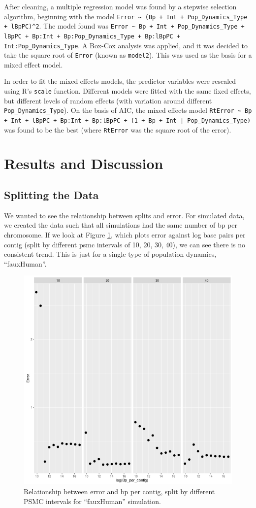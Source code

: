 \documentclass[11pt,a4paper]{article}
\begin{document}
After cleaning, a multiple regression model was found by a stepwise selection algorithm, beginning with the model \verb|Error ~ (Bp + Int + Pop_Dynamics_Type + lBpPC)^2|. The model found was \verb|Error ~ Bp + Int + Pop_Dynamics_Type + lBpPC + Bp:Int + Bp:Pop_Dynamics_Type + Bp:lBpPC + Int:Pop_Dynamics_Type|. A Box-Cox analysis was applied, and it was decided to take the square root of \verb|Error| (known as \verb|model2|). This was used as the basis for a mixed effect model.

In order to fit the mixed effects models, the predictor variables were rescaled using R's \verb|scale| function. Different models were fitted with the same fixed effects, but different levels of random effects (with variation around different \verb|Pop_Dynamics_Type|). On the basis of AIC, the mixed effects model \verb;RtError ~ Bp + Int + lBpPC + Bp:Int + Bp:lBpPC + (1 + Bp + Int | Pop_Dynamics_Type); was found to be the best (where \verb|RtError| was the square root of the error).



\section{Results and Discussion}

\subsection{Splitting the Data}
We wanted to see the relationship between splits and error. For simulated data, we created the data such that all simulations had the same number of bp per chromosome. If we look at Figure \ref{fauxHumanErrorVsBpWithIntGrid}, which plots error against log base pairs per contig (split by different psmc intervals of 10, 20, 30, 40), we can see there is no consistent trend. This is just for a single type of population dynamics, ``fauxHuman''.

\begin{figure}[h]
  \center
  \includegraphics[width=.7\linewidth]{figures/fauxHumanErrorVsBpWithIntGrid.png}
  \caption{Relationship between error and bp per contig, split by different PSMC intervals for ``fauxHuman'' simulation.}\label{fauxHumanErrorVsBpWithIntGrid}
\end{figure}
\end{document}
